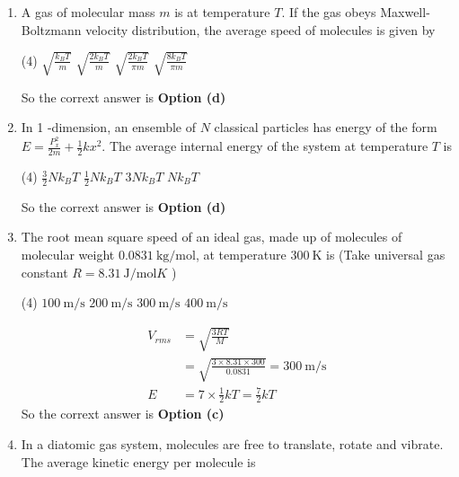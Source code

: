\begin{enumerate}
\begin{answer}
\end{answer}
\item A gas of molecular mass $m$ is at temperature $T$. If the gas obeys Maxwell-Boltzmann velocity distribution, the average speed of molecules is given by
 \begin{tasks}(4)
	\task[\textbf{a.}]$\sqrt{\frac{k_{B} T}{m}}$
	\task[\textbf{b.}]$\sqrt{\frac{2 k_{B} T}{m}}$
	\task[\textbf{c.}]$\sqrt{\frac{2 k_{B} T}{\pi m}}$
	\task[\textbf{d.}] $\sqrt{\frac{8 k_{B} T}{\pi m}}$
\end{tasks}
\begin{answer}
	So the corrext answer is \textbf{Option (d)}
\end{answer}
\item In 1 -dimension, an ensemble of $N$ classical particles has energy of the form $E=\frac{P_{x}^{2}}{2 m}+\frac{1}{2} k x^{2}$. The average internal energy of the system at temperature $T$ is
 \begin{tasks}(4)
	\task[\textbf{a.}]$\frac{3}{2} N k_{B} T$
	\task[\textbf{b.}]$\frac{1}{2} N k_{B} T$
	\task[\textbf{c.}]$3 N k_{B} T$
	\task[\textbf{d.}] $N k_{B} T$
\end{tasks}
\begin{answer}
	So the corrext answer is \textbf{Option (d)}
\end{answer}
\item The root mean square speed of an ideal gas, made up of molecules of molecular weight $0.0831 \mathrm{~kg} / \mathrm{mol}$, at temperature $300 \mathrm{~K}$ is (Take universal gas constant $R=8.31 \mathrm{~J} / \mathrm{mol} \mathrm{} K$ )
 \begin{tasks}(4)
	\task[\textbf{a.}] $100 \mathrm{~m} / \mathrm{s}$
	\task[\textbf{b.}]$200 \mathrm{~m} / \mathrm{s}$
	\task[\textbf{c.}] $300 \mathrm{~m} / \mathrm{s}$
	\task[\textbf{d.}]  $400 \mathrm{~m} / \mathrm{s}$
\end{tasks}
\begin{answer}
	$$
	\begin{aligned}
	V_{r m s} &=\sqrt{\frac{3 R T}{M}} \\
	&=\sqrt{\frac{3 \times 8.31 \times 300}{0.0831}}=300 \mathrm{~m} / \mathrm{s}\\
	E&=7 \times \frac{1}{2} k T=\frac{7}{2} k T
\end{aligned}
$$
	So the corrext answer is \textbf{Option (c)}
\end{answer}
\item In a diatomic gas system, molecules are free to translate, rotate and vibrate. The average kinetic energy per molecule is

\end{enumerate}
